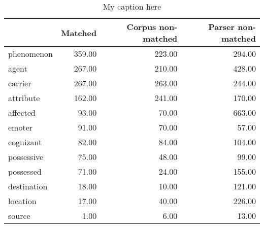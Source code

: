 \begin{table}[!ht]
\centering
\begin{tabular}{lrrr}
\toprule
{} &  Matched &  Corpus non-matched &  Parser non-matched \\
\midrule
phenomenon  &   359.00 &              223.00 &              294.00 \\
agent       &   267.00 &              210.00 &              428.00 \\
carrier     &   267.00 &              263.00 &              244.00 \\
attribute   &   162.00 &              241.00 &              170.00 \\
affected    &    93.00 &               70.00 &              663.00 \\
emoter      &    91.00 &               70.00 &               57.00 \\
cognizant   &    82.00 &               84.00 &              104.00 \\
possessive  &    75.00 &               48.00 &               99.00 \\
possessed   &    71.00 &               24.00 &              155.00 \\
destination &    18.00 &               10.00 &              121.00 \\
location    &    17.00 &               40.00 &              226.00 \\
source      &     1.00 &                6.00 &               13.00 \\
\bottomrule
\end{tabular}
\caption{My caption here}
\label{tab:PARTICIPANT_ROLE_MOST_USED-oe-data}
\end{table}